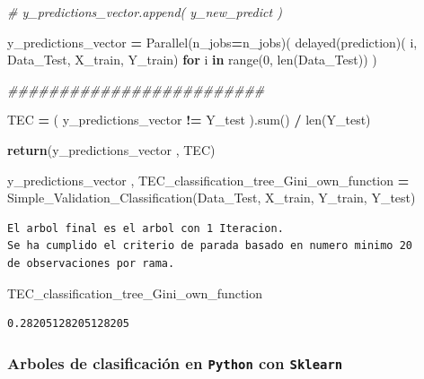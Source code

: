 \documentclass[
  11pt,
  a4paper,
]{article}
\newenvironment{Shaded}{\begin{snugshade}}{\end{snugshade}}
\newcommand{\BuiltInTok}[1]{#1}
\newcommand{\CommentTok}[1]{\textcolor[rgb]{0.56,0.35,0.01}{\textit{#1}}}
\newcommand{\ControlFlowTok}[1]{\textcolor[rgb]{0.13,0.29,0.53}{\textbf{#1}}}
\newcommand{\DecValTok}[1]{\textcolor[rgb]{0.00,0.00,0.81}{#1}}
\newcommand{\KeywordTok}[1]{\textcolor[rgb]{0.13,0.29,0.53}{\textbf{#1}}}
\newcommand{\NormalTok}[1]{#1}
\newcommand{\OperatorTok}[1]{\textcolor[rgb]{0.81,0.36,0.00}{\textbf{#1}}}
\begin{document}
\begin{Shaded}
\begin{Highlighting}[]
        \CommentTok{\# y\_predictions\_vector.append( y\_new\_predict )}

    
\NormalTok{    y\_predictions\_vector }\OperatorTok{=}\NormalTok{ Parallel(n\_jobs}\OperatorTok{=}\NormalTok{n\_jobs)( delayed(prediction)( i, Data\_Test, X\_train, Y\_train) }\ControlFlowTok{for}\NormalTok{ i }\KeywordTok{in} \BuiltInTok{range}\NormalTok{(}\DecValTok{0}\NormalTok{, }\BuiltInTok{len}\NormalTok{(Data\_Test)) )}

    \CommentTok{\#\#\#\#\#\#\#\#\#\#\#\#\#\#\#\#\#\#\#\#\#\#\#\#\#}

 
\NormalTok{    TEC }\OperatorTok{=}\NormalTok{ ( y\_predictions\_vector }\OperatorTok{!=}\NormalTok{ Y\_test ).}\BuiltInTok{sum}\NormalTok{()  }\OperatorTok{/} \BuiltInTok{len}\NormalTok{(Y\_test)     }

 
    \ControlFlowTok{return}\NormalTok{(y\_predictions\_vector , TEC)}
\end{Highlighting}
\end{Shaded}

\vspace{0.3cm}

\begin{Shaded}
\begin{Highlighting}[]
\NormalTok{y\_predictions\_vector , TEC\_classification\_tree\_Gini\_own\_function }\OperatorTok{=}\NormalTok{ Simple\_Validation\_Classification(Data\_Test, X\_train, Y\_train, Y\_test)}
\end{Highlighting}
\end{Shaded}

\begin{verbatim}
El arbol final es el arbol con 1 Iteracion. 
Se ha cumplido el criterio de parada basado en numero minimo 20 
de observaciones por rama.
\end{verbatim}

\begin{Shaded}
\begin{Highlighting}[]
\NormalTok{TEC\_classification\_tree\_Gini\_own\_function}
\end{Highlighting}
\end{Shaded}

\begin{verbatim}
0.28205128205128205
\end{verbatim}

\newpage

\hypertarget{arboles-de-clasificaciuxf3n-en-python-con-sklearn}{%
\subsubsection{\texorpdfstring{Arboles de clasificación en
\texttt{Python} con
\texttt{Sklearn}}{Arboles de clasificación en Python con Sklearn}}\label{arboles-de-clasificaciuxf3n-en-python-con-sklearn}}
\end{document}
